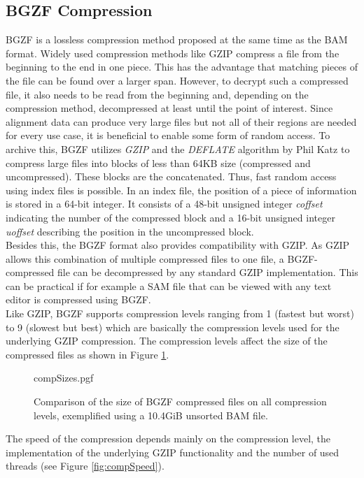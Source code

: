 \subsection{BGZF Compression}
BGZF is a lossless compression method proposed at the same time as the BAM format. Widely used compression methods like GZIP compress a file from the beginning to the end in one piece. This has the advantage that matching pieces of the file can be found over a larger span. However, to decrypt such a compressed file, it also needs to be read from the beginning and, depending on the compression method, decompressed at least until the point of interest. Since alignment data can produce very large files but not all of their regions are needed for every use case, it is beneficial to enable some form of random access. To archive this, BGZF utilizes \textit{GZIP} \cite{gzip} and the \textit{DEFLATE} algorithm \cite{deflate} by Phil Katz to compress large files into blocks of less than 64KB size (compressed and uncompressed). These blocks are the concatenated. Thus, fast random access using index files is possible. In an index file, the position of a piece of information is stored in a 64-bit integer. It consists of a 48-bit unsigned integer \textit{coffset} indicating the number of the compressed block and a 16-bit unsigned integer \textit{uoffset} describing the position in the uncompressed block. \\
Besides this, the BGZF format also provides compatibility with GZIP. As GZIP allows this combination of multiple compressed files to one file, a BGZF-compressed file can be decompressed by any standard GZIP implementation. This can be practical if for example a SAM file that can be viewed with any text editor is compressed using BGZF. \\
Like GZIP, BGZF supports compression levels ranging from 1 (fastest but worst) to 9 (slowest but best) which are basically the compression levels used for the underlying GZIP compression. The compression levels affect the size of the compressed files as shown in Figure \ref{fig:compSizes}.
\begin{figure}
        {compSizes.pgf}
    \caption{Comparison of the size of BGZF compressed files on all compression levels, exemplified using a 10.4GiB unsorted BAM file.}
    \label{fig:compSizes}
\end{figure}
The speed of the compression depends mainly on the compression level, the implementation of the underlying GZIP functionality and the number of used threads (see Figure \ref{fig:compSpeed}).  
